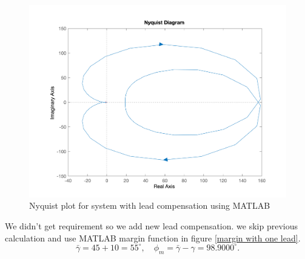 \begin{figure}[H]
	\caption{Nyquist plot for system with lead compensation using MATLAB}
	\centering
	\includegraphics[width=12cm]{../Figure/Q1/a/two_lead_new_nyquist.png}
\end{figure}
We didn't get requirement so we add new lead compensation.
we skip previous calculation and use MATLAB margin function in figure \ref{margin with one lead}.
$$
\bar{\gamma} = 45 + 10 = 55^{\circ},\quad \phi_m = \bar{\gamma} - \gamma = 98.9000^{\circ}.
$$

